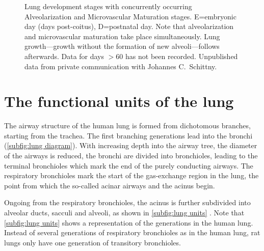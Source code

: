 \begin{figure}[htb]
	\noindent\makebox[\textwidth]{%
		\centering%
		}%
	\caption[Lung development stages, revised paradigm]{Lung development stages with concurrently occurring Alveolarization and Microvascular Maturation stages. E=embryonic day (days post-coitus), D=postnatal day. Note that alveolarization and microvascular maturation take place simultaneously. Lung growth---growth without the formation of new alveoli---follows afterwards. Data for days $>$60 has not been recorded. Unpublished data from private communication with Johannes C.\ Schittny.}
	\label{fig:lung development stages new}
\end{figure}

\section{The functional units of the lung}\label{sec:functional units of the lung}
The airway structure of the human lung is formed from dichotomous branches, starting from the trachea. The first branching generations lead into the bronchi (\autoref{subfig:lung diagram}). With increasing depth into the airway tree, the diameter of the airways is reduced, the bronchi are divided into bronchioles, leading to the terminal bronchioles which mark the end of the purely conducting airways. The respiratory bronchioles mark the start of the gas-exchange region in the lung, the point from which the so-called acinar airways and the acinus begin. 

Ongoing from the respiratory bronchioles, the acinus is further subdivided into alveolar ducts, sacculi and alveoli, as shown in \autoref{subfig:lung units} \cite{Haefeli-Bleuer1988,Weibel1963,Weibel2009,Schittny2007a}. Note that \autoref{subfig:lung units} shows a representation of the generations in the human lung. Instead of several generations of respiratory bronchioles as in the human lung, rat lungs only have one generation of transitory bronchioles.

